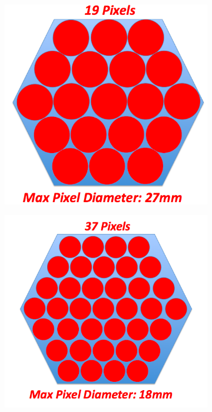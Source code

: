\documentclass[12pt, titlepage]{article} %
\begin{document}
\begin{figure}[H]
\begin{subfigure}{0.3\textwidth}
		\includegraphics[width=\linewidth]{PNG/19pixels}
	\end{subfigure}%
	\begin{subfigure}{0.3\textwidth}
		\centering
		\includegraphics[width=\linewidth]{PNG/37pixels}
	\end{subfigure} \\
	

\end{figure}
\end{document}
